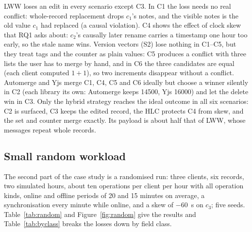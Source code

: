 LWW loses an edit in every scenario except C3. In C1 the loss needs no real conflict: whole-record replacement drops
$c_1$'s notes, and the visible notes is the old value $c_1$ had replaced (a causal violation). C4 shows the effect of clock skew that RQ1 asks about: $c_2$'s
causally later rename carries a timestamp one hour too early, so the stale name wins. Version vectors (S2) lose
nothing in C1--C5, but they treat tags and the counter as plain values: C5 produces a conflict with three lists the
user has to merge by hand, and in C6 the three candidates are equal (each client computed $1+1$), so two increments
disappear without a conflict. Automerge and Yjs merge C1, C4, C5 and C6 ideally but choose a winner silently in C2
(each library its own: Automerge keeps 14500, Yjs 16000) and let the delete win in C3. Only the hybrid strategy reaches
the ideal outcome in all six scenarios: C2 is surfaced, C3 keeps the edited record, the HLC protects C4 from skew, and
the set and counter merge exactly. Its payload is about half that of LWW, whose messages repeat whole
records.

\subsection{Small random workload}
The second part of the case study is a randomised run: three clients, six records, two simulated hours, about ten
operations per client per hour with all operation kinds, online and offline periods of 20 and 15 minutes on average,
a synchronisation every minute while online, and a skew of $-60$~s on $c_3$; five seeds.
Table~\ref{tab:random} and Figure~\ref{fig:random} give the results and Table~\ref{tab:byclass} breaks the losses down
by field class.

\begin{table}[ht]
\caption{Small random workload: mean $\pm$ sample standard deviation over five seeds (about 63 operations per run).
1~KB = 1000 bytes; the state is that of the server replica.}
\label{tab:random}
\footnotesize
\setlength{\tabcolsep}{3pt}

\end{table}

\begin{table}[ht]
\caption{Lost operations per field class over the five seeds of the random workload (lost / judged).}
\label{tab:byclass}
\footnotesize

\end{table}

